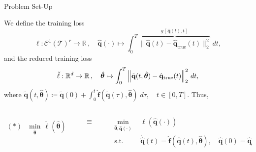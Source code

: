 \begin{frame}{Problem Set-Up}

We define the \textcolor{codeblue}{training loss} 
\vspace{-0.6cm}
\begin{equation*}
        \ell: \mathcal{C}^1(\mathcal{T})^r  \to \mathbb{R}\,,\quad \hat{\mathbf{q}}(\cdot) \mapsto  \int_0^T \overbrace{\Big\|\hat{\mathbf{q}}(t) - \hat{\mathbf{q}}_\mathrm{true}(t)\Big\|_2^2}^{g(\hat{\mathbf{q}}(t),t)}~dt,
        \label{eq:continuous_loss}
\end{equation*}
and the \textcolor{codeblue}{reduced training loss}
\begin{equation*}
        \tilde{\ell}: \mathbb{R}^d  \to \mathbb{R}\,,\quad \hat{\bm{\theta}} \mapsto \int_0^T \norm{\tilde{\mathbf{q}}(t,\hat{\bm{\theta}}) - \hat{\mathbf{q}}_\mathrm{true}(t)}_2^2~dt,
        \label{eq:continuous_reduced_loss}
    \end{equation*}
    where $\tilde{\mathbf{q}}(t, \hat{\bm{\theta}}) \coloneqq \tilde{\mathbf{q}}(0) + \displaystyle\int_{0}^t \hat{\mathbf{f}}(\tilde{\mathbf{q}}(\tau),\hat{\bm{\theta}})\;d\tau, \quad t\in[0,T]$. Thus,

\begin{columns}[T]
\begin{column}{0.1\textwidth}
\begin{align*}
    ~&~\\
    \bm{(*)}\quad\underset{\hat{\bm{\theta}}}{\mathrm{min}}~~\tilde\ell (\hat{\bm{\theta}})
\end{align*}
\end{column}

\begin{column}{0.03\textwidth}
\begin{align*}
    ~&~\\
    \bm{\equiv}
\end{align*}
\end{column}

\begin{column}{0.4\textwidth}
\begin{align*}
    \underset{\hat{\bm{\theta}},\hat{\mathbf{q}}(\cdot)}{\mathrm{min}} ~~&\ell (\hat{\mathbf{q}}(\cdot))\\
    \mathrm{s.t.}~~&\dot{\hat{\mathbf{q}}}(t) = \hat{\mathbf{f}}(\hat{\mathbf{q}}(t),\hat{\bm{\theta}}), \quad\hat{\mathbf{q}}(0)=\hat{\mathbf{q}}_0
    \label{eq:opt_problem}
\end{align*}
\end{column}
\end{columns}

\end{frame}


